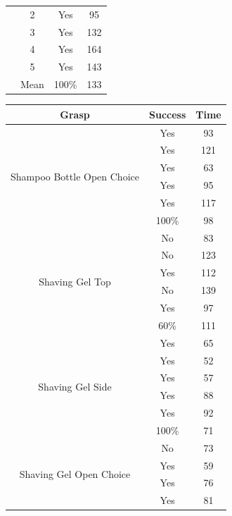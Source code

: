\begin{table}[t]
\begin{minipage}[t]{0.5\columnwidth}
\begin{tabular}[t!]{ | c c c c | }
&2 & Yes & 95 \\
&3 & Yes & 132 \\
&4 & Yes & 164 \\
&5 & Yes & 143 \\ 
& Mean & 100\% & 133\\\hline
\end{tabular}
\end{minipage}
\hspace{.03\columnwidth}
\raggedright
\begin{minipage}[!t]{.4\columnwidth}
\begin{tabular}[t!]{ | c c c | }
\hline
Grasp & Success & Time \\ \hline \hline
\multirow{6}{*}{\begin{minipage}[t]{0.2\columnwidth}Shampoo Bottle Open Choice\end{minipage}}& Yes & 93 \\
& Yes & 121 \\
& Yes & 63 \\
& Yes & 95 \\
& Yes & 117 \\ 
& 100\% & 98\\\hline 
\multirow{6}{*}{\begin{minipage}[t]{0.2\columnwidth}Shaving Gel Top\end{minipage}} & No & 83 \\ 
& No & 123 \\ 
& Yes & 112\\
& No & 139 \\
& Yes & 97 \\ 
&  60\% & 111\\\hline 
\multirow{6}{*}{\begin{minipage}[t]{0.2\columnwidth}Shaving Gel Side\end{minipage}} & Yes & 65 \\
& Yes & 52 \\
& Yes & 57 \\
& Yes & 88 \\
& Yes & 92 \\ 
& 100\% & 71\\\hline 
\multirow{6}{*}{\begin{minipage}[t]{0.2\columnwidth}Shaving Gel Open Choice\end{minipage}} & No & 73 \\
& Yes & 59 \\
& Yes & 76 \\
& Yes & 81 \\

\end{tabular}
\end{minipage}
\end{table}
